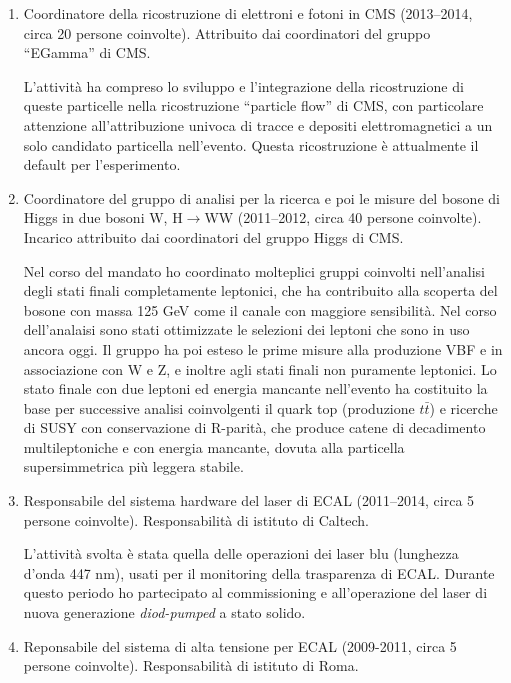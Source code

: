 \documentclass[11pt,twoside,a4paper]{article}
\begin{document}
\begin{enumerate}
  \item Coordinatore della ricostruzione di elettroni e fotoni in CMS
    (2013--2014, circa 20 persone coinvolte). Attribuito dai
    coordinatori del gruppo ``EGamma'' di CMS.

    L'attivit\`a ha compreso lo sviluppo e l'integrazione della
    ricostruzione di queste particelle nella ricostruzione ``particle
    flow'' di CMS, con particolare attenzione all'attribuzione univoca
    di tracce e depositi elettromagnetici a un solo candidato
    particella nell'evento. Questa ricostruzione \`e attualmente il
    default per l'esperimento.

  \item Coordinatore del gruppo di analisi per la ricerca e poi le
    misure del bosone di Higgs in due bosoni W, H$\to$WW
    (2011--2012, circa 40 persone coinvolte). Incarico attribuito
    dai coordinatori del gruppo Higgs di CMS.

    Nel corso del mandato ho coordinato molteplici gruppi coinvolti
    nell'analisi degli stati finali completamente leptonici, che ha
    contribuito alla scoperta del bosone con massa 125 GeV come il
    canale con maggiore sensibilit\`a. Nel corso dell'analaisi sono
    stati ottimizzate le selezioni dei leptoni che sono in uso ancora
    oggi. Il gruppo ha poi esteso le prime misure alla produzione VBF
    e in associazione con W e Z, e inoltre agli stati finali non
    puramente leptonici. Lo stato finale con due leptoni ed energia
    mancante nell'evento ha costituito la base per successive analisi
    coinvolgenti il quark top (produzione $t\bar t$) e ricerche di
    SUSY con conservazione di R-parit\`a, che produce catene di
    decadimento multileptoniche e con energia mancante, dovuta alla
    particella supersimmetrica pi\`u leggera stabile.

  \item Responsabile del sistema hardware del laser di ECAL
    (2011--2014, circa 5 persone coinvolte). Responsabilit\`a di
    istituto di Caltech.

    L'attivit\`a svolta \`e stata quella delle operazioni dei laser
    blu (lunghezza d'onda 447 nm), usati per il monitoring della
    trasparenza di ECAL. Durante questo periodo ho partecipato al
    commissioning e all'operazione del laser di nuova generazione
    \textit{diod-pumped} a stato solido.

  \item Reponsabile del sistema di alta tensione per ECAL (2009-2011,
    circa 5 persone coinvolte). Responsabilit\`a di istituto di Roma.


\end{enumerate}
\end{document}

